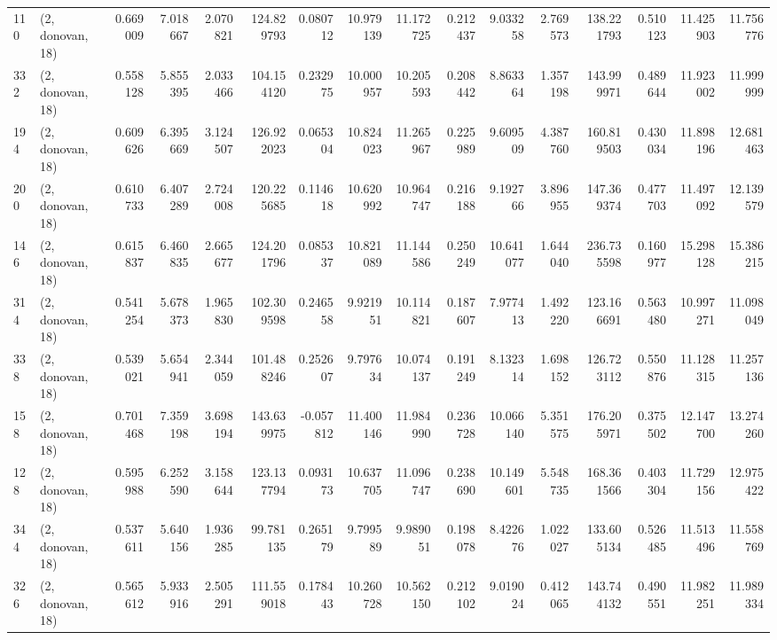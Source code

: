 \begin{tabular}{llrrrrrrrrrrrrrr}
110 &  (2, donovan, 18) &   0.669009 &   7.018667 &   2.070821 &   124.829793 &   0.080712 &  10.979139 &  11.172725 &  0.212437 &   9.033258 &   2.769573 &   138.221793 &  0.510123 &  11.425903 &  11.756776 \\
332 &  (2, donovan, 18) &   0.558128 &   5.855395 &   2.033466 &   104.154120 &   0.232975 &  10.000957 &  10.205593 &  0.208442 &   8.863364 &   1.357198 &   143.999971 &  0.489644 &  11.923002 &  11.999999 \\
194 &  (2, donovan, 18) &   0.609626 &   6.395669 &   3.124507 &   126.922023 &   0.065304 &  10.824023 &  11.265967 &  0.225989 &   9.609509 &   4.387760 &   160.819503 &  0.430034 &  11.898196 &  12.681463 \\
200 &  (2, donovan, 18) &   0.610733 &   6.407289 &   2.724008 &   120.225685 &   0.114618 &  10.620992 &  10.964747 &  0.216188 &   9.192766 &   3.896955 &   147.369374 &  0.477703 &  11.497092 &  12.139579 \\
146 &  (2, donovan, 18) &   0.615837 &   6.460835 &   2.665677 &   124.201796 &   0.085337 &  10.821089 &  11.144586 &  0.250249 &  10.641077 &   1.644040 &   236.735598 &  0.160977 &  15.298128 &  15.386215 \\
314 &  (2, donovan, 18) &   0.541254 &   5.678373 &   1.965830 &   102.309598 &   0.246558 &   9.921951 &  10.114821 &  0.187607 &   7.977413 &   1.492220 &   123.166691 &  0.563480 &  10.997271 &  11.098049 \\
338 &  (2, donovan, 18) &   0.539021 &   5.654941 &   2.344059 &   101.488246 &   0.252607 &   9.797634 &  10.074137 &  0.191249 &   8.132314 &   1.698152 &   126.723112 &  0.550876 &  11.128315 &  11.257136 \\
158 &  (2, donovan, 18) &   0.701468 &   7.359198 &   3.698194 &   143.639975 &  -0.057812 &  11.400146 &  11.984990 &  0.236728 &  10.066140 &   5.351575 &   176.205971 &  0.375502 &  12.147700 &  13.274260 \\
128 &  (2, donovan, 18) &   0.595988 &   6.252590 &   3.158644 &   123.137794 &   0.093173 &  10.637705 &  11.096747 &  0.238690 &  10.149601 &   5.548735 &   168.361566 &  0.403304 &  11.729156 &  12.975422 \\
344 &  (2, donovan, 18) &   0.537611 &   5.640156 &   1.936285 &    99.781135 &   0.265179 &   9.799589 &   9.989051 &  0.198078 &   8.422676 &   1.022027 &   133.605134 &  0.526485 &  11.513496 &  11.558769 \\
326 &  (2, donovan, 18) &   0.565612 &   5.933916 &   2.505291 &   111.559018 &   0.178443 &  10.260728 &  10.562150 &  0.212102 &   9.019024 &   0.412065 &   143.744132 &  0.490551 &  11.982251 &  11.989334 \\

\end{tabular}
